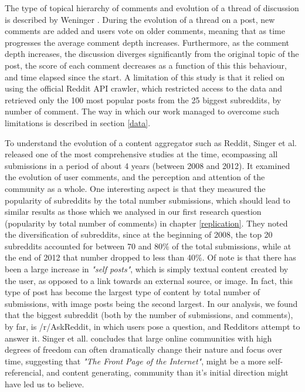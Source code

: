 \documentclass[bsc,frontabs,twoside,singlespacing,parskip,deptreport]{infthesis}
\begin{document}
The type of topical hierarchy of comments and evolution of a thread of discussion is described by Weninger \cite{weninger}. During the evolution of a thread on a post, new comments are added and users vote on older comments, meaning that as time progresses the average comment depth increases. Furthermore, as the comment depth increases, the discussion diverges significantly from the original topic of the post, the score of each comment decreases as a function of this this behaviour, and time elapsed since the start. A limitation of this study is that it relied on using the official Reddit API crawler, which restricted access to the data and retrieved only the 100 most popular posts from the 25 biggest subreddits, by number of comment. The way in which our work managed to overcome such limitations is described in section \ref{data}.

To understand the evolution of a content aggregator such as Reddit, Singer et al. \cite{singer} released one of the most comprehensive studies at the time, ecompassing all submissions in a period of about 4 years (between 2008 and 2012). It examined the evolution of user comments, and the perception and attention of the community as a whole. One interesting aspect is that they measured the popularity of subreddits by the total number submissions, which should lead to similar results as those which we analysed in our first research question (popularity by total number of comments) in chapter \ref{replication}. They noted the diversification of subreddits, since at the beginning of 2008, the top 20 subreddits accounted for between 70 and 80\% of the total submissions, while at the end of 2012 that number dropped to less than 40\%. Of note is that there has been a large increase in \textit{"self posts"}, which is simply textual content created by the user, as opposed to a link towards an external source, or image. In fact, this type of post has become the largest type of content by total number of submissions, with image posts being the second largest. In our analysis, we found that the biggest subreddit (both by the number of submissions, and comments), by far, is /r/AskReddit, in which users pose a question, and Redditors attempt to answer it. Singer et all. \cite{singer} concludes that large online communities with high degrees of freedom can often dramatically change their nature and focus over time, suggesting that \textit{"The Front Page of the Internet"}, might be a more self-referencial, and content generating, community than it's initial direction might have led us to believe.
\end{document}
